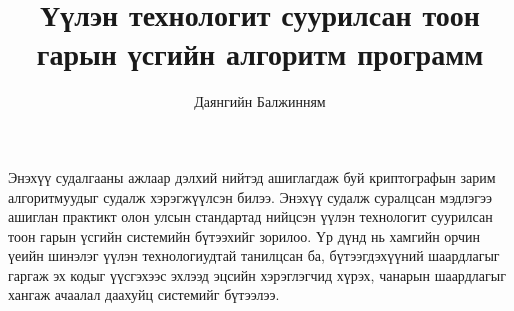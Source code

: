 \documentclass[12pt,A4]{report}
\begin{document}

\title{Үүлэн технологит суурилсан тоон гарын үсгийн алгоритм программ}
\author{Даянгийн Балжинням}













% 


Энэхүү судалгааны ажлаар дэлхий нийтэд ашиглагдаж буй криптографын зарим алгоритмуудыг судалж хэрэгжүүлсэн билээ. Энэхүү судалж суралцсан мэдлэгээ ашиглан практикт олон улсын стандартад нийцсэн үүлэн технологит суурилсан тоон гарын үсгийн системийн бүтээхийг зорилоо. Үр дүнд нь хамгийн орчин үеийн шинэлэг үүлэн технологиудтай танилцсан ба, бүтээгдэхүүний шаардлагыг гаргаж эх кодыг үүсгэхээс эхлээд эцсийн хэрэглэгчид хүрэх, чанарын шаардлагыг хангаж ачаалал даахуйц системийг бүтээлээ.
\end{document}
